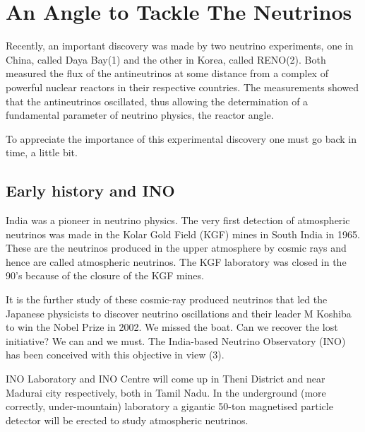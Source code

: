 \chapter[The Reluctant Quantum Mechanician]{An Angle to Tackle The Neutrinos}\label{chap22}


\vskip -5pt

Recently, an important discovery was made by two neutrino
experiments, one in China, called Daya Bay(1) and the other
in Korea, called RENO(2). Both measured the flux of 
the antineutrinos at some distance from a complex of  
powerful nuclear reactors in their respective countries.
The measurements showed that the antineutrinos oscillated,
thus allowing the determination of a fundamental parameter
of neutrino physics, the reactor angle.

To appreciate the importance of this experimental discovery
one must go back in time, a little bit.

\section*{Early history and INO}

India was a pioneer in neutrino physics. The very first 
detection of atmospheric neutrinos was made in the Kolar 
Gold Field (KGF) mines in South India in 1965. These are
the neutrinos produced in the upper atmosphere by cosmic
rays and hence are called atmospheric neutrinos. The KGF
laboratory was closed in the 90's because of the closure
of the KGF mines.
  
It is the further study of these cosmic-ray produced neutrinos 
that led the Japanese physicists to discover neutrino oscillations 
and their leader M Koshiba to win the Nobel Prize
in 2002. We missed the boat. Can we recover the lost initiative?
We can and we must. The India-based Neutrino Observatory (INO)
has been conceived with this objective in view (3).

INO Laboratory and INO Centre will come up in Theni District 
and near Madurai city respectively, both in Tamil Nadu. In the 
underground (more correctly, under-mountain) laboratory 
a gigantic 50-ton magnetised particle detector will be erected to 
study atmospheric neutrinos.


